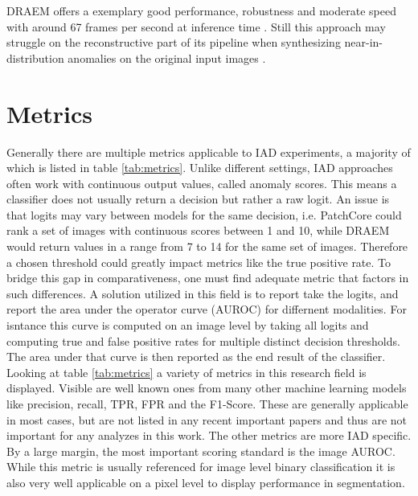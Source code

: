 DRAEM offers a exemplary good performance, robustness and moderate speed with around 67 frames per second at inference time \cite{liu2023simplenet}. Still this approach may struggle on the reconstructive 
part of its pipeline when synthesizing near-in-distribution anomalies on the original input images \cite{liu2024deep}. %










\section{Metrics}
\label{sec:metrics}

Generally there are multiple metrics applicable to IAD experiments, a majority of which is listed in table \ref{tab:metrics}. Unlike different 
settings, IAD approaches often work with continuous output values, called anomaly scores. This means a classifier does not usually return 
a decision but rather a raw logit. An issue is that logits may vary between models for the same decision, i.e. PatchCore \cite{patchCore2022} could rank a set of images 
with continuous scores between 1 and 10, while DRAEM \cite{Zavrtanik_2021DRAEM} would return values in a range from 7 to 14 for the same 
set of images. Therefore a chosen threshold could greatly impact metrics like the true positive rate. To bridge this gap in comparativeness, one must find adequate metric that factors in such differences.
A solution utilized in this field is to report take the logits, and report the area under the operator curve (AUROC) for differnent modalities. 
For isntance this curve is computed on an image level by taking all logits and computing true and false positive rates for multiple distinct 
decision thresholds. The area under that curve is then reported as the end result of the classifier.
\newline\newline
Looking at table \ref{tab:metrics} a variety of metrics in this research field is displayed. Visible are well known 
ones from many other machine learning models like precision, recall, TPR, FPR and the F1-Score. These are generally applicable in most 
cases, but are not listed in any recent important papers and thus are not important for any analyzes in this work. The other metrics are 
more IAD specific. By a large margin, the most important scoring standard is the image AUROC. While this metric is usually referenced for image level 
binary classification it is also very well applicable on a pixel level to display performance in segmentation. 

